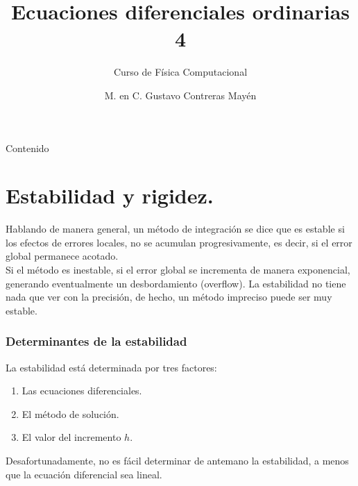 

\title{Ecuaciones diferenciales ordinarias 4}
\subtitle{Curso de Física Computacional}
\author[]{M. en C. Gustavo Contreras Mayén}

\maketitle
\fontsize{14}{14}\selectfont
{}
\begin{frame}{Contenido}
\tableofcontents[pausesections]
\end{frame}
\section{Estabilidad y rigidez.}
\begin{frame}
Hablando de manera general, un método de integración se dice que es estable si los efectos de errores locales, no se acumulan progresivamente, es decir, si el error global permanece acotado.
\\
\medskip
Si el método es inestable, si el error global se incrementa de manera exponencial, generando eventualmente un desbordamiento (overflow). La estabilidad no tiene nada que ver con la precisión, de hecho, un método impreciso puede ser muy estable.
\end{frame}
\begin{frame}
\frametitle{Determinantes de la estabilidad}
La estabilidad está determinada por tres factores:
\begin{enumerate}[<+->]
\item Las ecuaciones diferenciales.
\item El método de solución.
\item El valor del incremento $h$.
\end{enumerate}
Desafortunadamente, no es fácil determinar de antemano la estabilidad, a menos que la ecuación diferencial sea lineal.
\end{frame}
